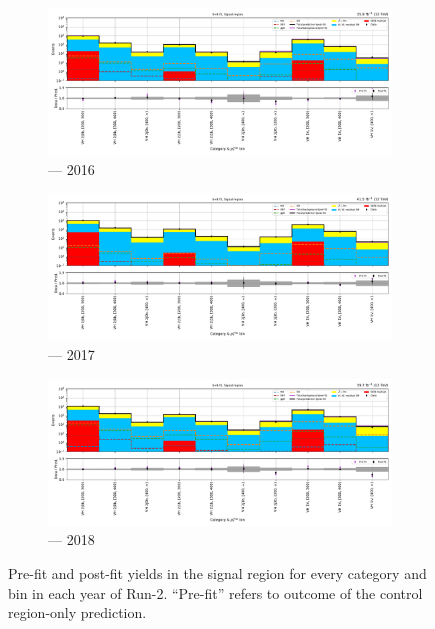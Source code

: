 \begin{figure}[htbp]
    \centering
    \begin{subfigure}[b]{0.9\textwidth}
        \includegraphics[width=\textwidth]{figures/mountain_ranges/2016/VH/SR_tree_fit_s-abs_values_VH_cats.pdf}
        \caption{\VH --- 2016}
    \end{subfigure}

    \begin{subfigure}[b]{0.9\textwidth}
        \includegraphics[width=\textwidth]{figures/mountain_ranges/2017/VH/SR_tree_fit_s-abs_values_VH_cats.pdf}
        \caption{\VH --- 2017}
    \end{subfigure}

    \begin{subfigure}[b]{0.9\textwidth}
        \includegraphics[width=\textwidth]{figures/mountain_ranges/2018/VH/SR_tree_fit_s-abs_values_VH_cats.pdf}
        \caption{\VH --- 2018}
    \end{subfigure}
    \caption[Pre-fit and post-fit yields in the signal region for every \VH category and \ptmiss bin in each year of Run-2]{Pre-fit and post-fit yields in the signal region for every \VH category and \ptmiss bin in each year of Run-2. ``Pre-fit'' refers to outcome of the control region-only prediction.}
    \label{fig:htoinv_mountain_range_VH_SR_Postfit}
\end{figure}

